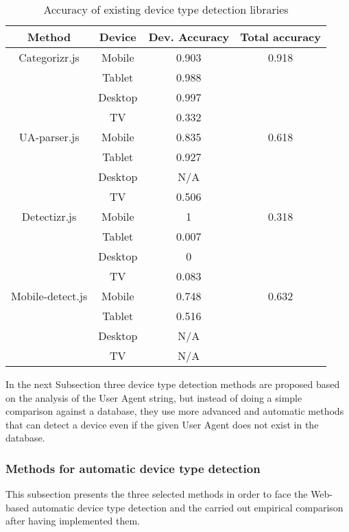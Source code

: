\begin{table}
	\centering
	\caption{Accuracy of existing device type detection libraries}
	\label{tab:soaAcc}
	\begin{tabular}{||c|c|c|c||}
		\hline
		\textbf{Method}&\textbf{Device}& \textbf{Dev. Accuracy} &\textbf{Total accuracy} \\
		\hline
		Categorizr.js & Mobile & 0.903 & 0.918\\
		& Tablet & 0.988 & \\
		& Desktop & 0.997 & \\
		& TV & 0.332 & \\    
		\hline
		
		UA-parser.js & Mobile & 0.835 & 0.618\\
		& Tablet & 0.927 & \\
		& Desktop & N/A & \\
		& TV & 0.506 & \\    
		\hline
		
		Detectizr.js & Mobile & 1 & 0.318\\
		& Tablet & 0.007 & \\
		& Desktop & 0 & \\
		& TV & 0.083 & \\    
		\hline
		
		Mobile-detect.js & Mobile & 0.748 & 0.632\\
		& Tablet & 0.516 & \\
		& Desktop & N/A & \\
		& TV & N/A & \\        
		
		\hline
	\end{tabular}
\end{table}



In the next Subsection three device type detection methods are proposed based on the analysis of the User Agent string, but instead of doing a simple comparison against a database, they use more advanced and automatic methods that can detect a device even if the given User Agent does not exist in the database.

\subsubsection{Methods for automatic device type detection}
This subsection presents the three selected methods in order to face the Web-based automatic device type detection and the carried out empirical comparison after having implemented them.  

